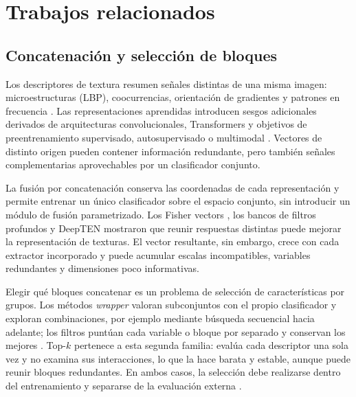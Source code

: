 \documentclass[a4paper,fleqn]{cas-sc}
\begin{document}
\section{Trabajos relacionados}\label{sec:trabajos}

\subsection{Concatenación y selección de bloques}

Los descriptores de textura resumen señales distintas de una misma imagen: microestructuras (LBP), coocurrencias, orientación de gradientes y patrones en frecuencia \citep{haralick1979glcm,ojala2002lbp,dalal2005hog,mehta2016drlbp}. Las representaciones aprendidas introducen sesgos adicionales derivados de arquitecturas convolucionales, Transformers y objetivos de preentrenamiento supervisado, autosupervisado o multimodal \citep{he2016resnet,tan2019efficientnet,dosovitskiy2021vit,liu2021swin,caron2021dino,oquab2024dinov2,he2022mae,radford2021clip,zhai2023siglip}. Vectores de distinto origen pueden contener información redundante, pero también señales complementarias aprovechables por un clasificador conjunto.

La fusión por concatenación conserva las coordenadas de cada representación y permite entrenar un único clasificador sobre el espacio conjunto, sin introducir un módulo de fusión parametrizado. Los Fisher vectors \citep{sanchez2013image}, los bancos de filtros profundos \citep{cimpoi2016fisher} y DeepTEN \citep{zhang2017deepten} mostraron que reunir respuestas distintas puede mejorar la representación de texturas. El vector resultante, sin embargo, crece con cada extractor incorporado y puede acumular escalas incompatibles, variables redundantes y dimensiones poco informativas.

Elegir qué bloques concatenar es un problema de selección de características por grupos. Los métodos \emph{wrapper} valoran subconjuntos con el propio clasificador y exploran combinaciones, por ejemplo mediante búsqueda secuencial hacia adelante; los filtros puntúan cada variable o bloque por separado y conservan los mejores \citep{kohavi1997wrappers,guyon2003feature}. Top-$k$ pertenece a esta segunda familia: evalúa cada descriptor una sola vez y no examina sus interacciones, lo que la hace barata y estable, aunque puede reunir bloques redundantes. En ambos casos, la selección debe realizarse dentro del entrenamiento y separarse de la evaluación externa \citep{kohavi1997wrappers,guyon2003feature}.
\end{document}
